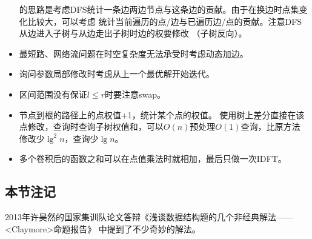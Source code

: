 \begin{itemize}
	      的思路是考虑DFS统计一条边两边节点与这条边的贡献。由于在换边时点集变化比较大，可以考虑
	      统计当前遍历的点/边与已遍历边/点的贡献。注意DFS从边进入子树与从边走出子树时边的权要修改
	      （子树反向）。
	\item 最短路、网络流问题在时空复杂度无法承受时考虑动态加边。
	\item 询问参数局部修改时考虑从上一个最优解开始迭代。
	\item 区间范围没有保证$l\leq r$时要注意swap。
	\item 节点到根的路径上的点权值+1，统计某个点的权值。
	使用树上差分直接在该点修改，查询时查询子树权值和，可以$O(n)$预处理$O(1)$查询，比原方法
	修改少$\lg^2 n$，查询少$\lg n$。
	\item 多个卷积后的函数之和可以在点值乘法时就相加，最后只做一次IDFT。
\end{itemize}
\subsection{本节注记}
2013年许昊然的国家集训队论文答辩《浅谈数据结构题的几个非经典解法——<Claymore>命题报告》
中提到了不少奇妙的解法。
